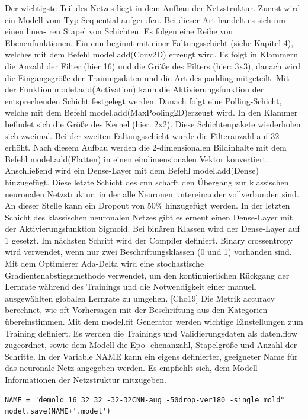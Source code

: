 Der wichtigste Teil des Netzes liegt in dem Aufbau der Netzstruktur. Zuerst wird ein
Modell vom Typ Sequential aufgerufen. Bei dieser Art handelt es sich um einen linea-
ren Stapel von Schichten. Es folgen eine Reihe von Ebenenfunktionen. Ein \ac{cnn} beginnt
mit einer Faltungsschicht (siehe Kapitel 4), welches mit dem Befehl model.add(Conv2D)
erzeugt wird. Es folgt in Klammern die Anzahl der Filter (hier 16) und die Größe des
Filters (hier: 3x3), danach wird die Eingangsgröße der Trainingsdaten und die Art des
padding mitgeteilt. Mit der Funktion model.add(Activation) kann die Aktivierungsfunktion 
der entsprechenden Schicht festgelegt werden. Danach folgt eine Polling-Schicht, 
welche mit dem Befehl model.add(MaxPooling2D)erzeugt wird. In den Klammer befindet
sich die Größe des Kernel (hier: 2x2). Diese Schichtenpakete wiederholen sich zweimal.
Bei der zweiten Faltungsschicht wurde die Filteranzahl auf 32 erhöht. Nach diesem Aufbau 
werden die 2-dimensionalen Bildinhalte mit dem Befehl model.add(Flatten) in einen
eindimensionalen Vektor konvertiert. Anschließend wird ein Dense-Layer mit dem Befehl
model.add(Dense) hinzugefügt. Diese letzte Schicht des \ac{cnn} schafft den Übergang zur
klassischen neuronalen Netzstruktur, in der alle Neuronen untereinander vollverbunden
sind. An dieser Stelle kann ein Dropout von 50\% hinzugefügt werden. In der letzten
Schicht des klassischen neuronalen Netzes gibt es erneut einen Dense-Layer mit der 
Aktivierungsfunktion Sigmoid. Bei binären Klassen wird der Dense-Layer auf 1 gesetzt.
Im nächsten Schritt wird der Compiler definiert. Binary crossentropy wird verwendet,
wenn nur zwei Beschriftungsklassen (0 und 1) vorhanden sind. Mit dem Optimierer Ada-Delta 
wird eine stochastische Gradientenabstiegsmethode verwendet, um den kontinuierlichen Rückgang 
der Lernrate während des Trainings und die Notwendigkeit einer manuell
ausgewählten globalen Lernrate zu umgehen. [Cho19] Die Metrik accuracy berechnet, wie
oft Vorhersagen mit der Beschriftung aus den Kategorien übereinstimmen. Mit 
dem model.fit Generator werden wichtige Einstellungen zum Training definiert. Es werden die
Trainings und Validierungsdaten als daten.flow zugeordnet, sowie dem Modell die Epo-
chenanzahl, Stapelgröße und Anzahl der Schritte. In der Variable NAME kann ein eigens
definierter, geeigneter Name für das neuronale Netz angegeben werden. Es empfiehlt sich,
dem Modell Informationen der Netzstruktur mitzugeben.

\begin{lstlisting}
NAME = "demold_16_32_32 -32-32CNN-aug -50drop-ver180 -single_mold"
model.save(NAME+'.model')
\end{lstlisting}

